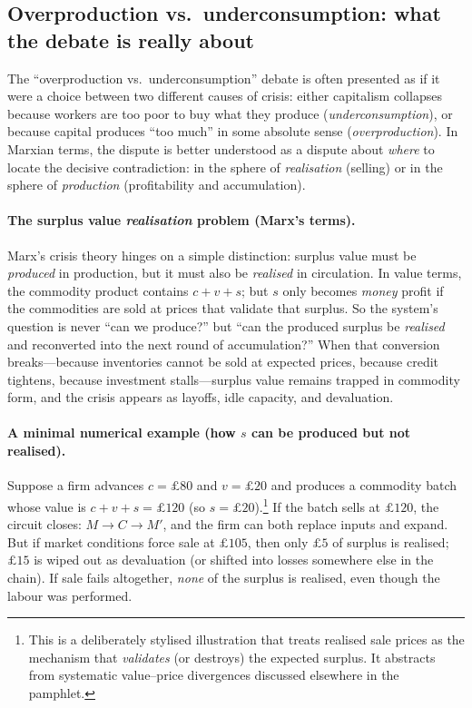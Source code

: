 \subsection{Overproduction vs.\ underconsumption: what the debate is really about}
\label{sec:overproduction-underconsumption}

The “overproduction vs.\ underconsumption” debate is often presented as if it were a choice
between two different causes of crisis:
either capitalism collapses because workers are too poor to buy what they produce
(\emph{underconsumption}), or because capital produces “too much” in some absolute sense
(\emph{overproduction}).
In Marxian terms, the dispute is better understood as a dispute about \emph{where} to locate
the decisive contradiction: in the sphere of \emph{realisation} (selling) or in the sphere of
\emph{production} (profitability and accumulation).

\paragraph{The surplus value \emph{realisation} problem (Marx’s terms).}
Marx’s crisis theory hinges on a simple distinction: surplus value must be
\emph{produced} in production, but it must also be \emph{realised} in circulation.
In value terms, the commodity product contains $c+v+s$; but $s$ only becomes
\emph{money} profit if the commodities are sold at prices that validate that surplus.
So the system’s question is never “can we produce?” but “can the produced surplus be
\emph{realised} and reconverted into the next round of accumulation?”
When that conversion breaks---because inventories cannot be sold at expected prices,
because credit tightens, because investment stalls---surplus value remains trapped in
commodity form, and the crisis appears as layoffs, idle capacity, and devaluation.

\paragraph{A minimal numerical example (how $s$ can be produced but not realised).}
Suppose a firm advances $c=\pounds 80$ and $v=\pounds 20$ and produces a commodity batch whose
value is $c+v+s=\pounds 120$ (so $s=\pounds 20$).\footnote{This is a deliberately stylised illustration that treats realised sale prices as the mechanism that \emph{validates} (or destroys) the expected surplus. It abstracts from systematic value--price divergences discussed elsewhere in the pamphlet.}
If the batch sells at $\pounds 120$, the circuit closes: $M \rightarrow C \rightarrow M'$, and the firm can
both replace inputs and expand.
But if market conditions force sale at $\pounds 105$, then only $\pounds 5$ of surplus is realised;
$\pounds 15$ is wiped out as devaluation (or shifted into losses somewhere else in the chain).
If sale fails altogether, \emph{none} of the surplus is realised, even though the labour was performed.


